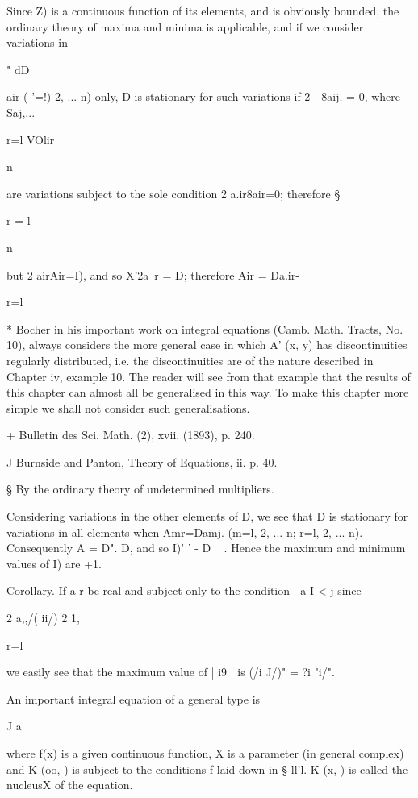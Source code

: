 Since Z) is a continuous function of its elements, and is obviously
bounded, the ordinary theory of maxima and minima is applicable, and
if we consider variations in

" dD

air ( '=!) 2, ... n) only, D is stationary for such variations if 2 -
8aij. = 0, where Saj,...

r=l VOlir

n

are variations subject to the sole condition 2 a.ir8air=0; therefore
§

r = l

n

but 2 airAir=I), and so X'2a\ r = D; therefore Air = Da.ir-

r=l

* Bocher in his important work on integral equations (Camb. Math.
Tracts, No. 10), always considers the more general case in which A'
(x, y) has discontinuities regularly distributed, i.e. the
discontinuities are of the nature described in Chapter iv, example 10.
The reader will see from that example that the results of this chapter
can almost all be generalised in this way. To make this chapter more
simple we shall not consider such generalisations.

+ Bulletin des Sci. Math. (2), xvii. (1893), p. 240.

J Burnside and Panton, Theory of Equations, ii. p. 40.

§ By the ordinary theory of undetermined multipliers.

%
%

Considering variations in the other elements of D, we see that D is
stationary for variations in all elements when Amr=Damj. (m=l, 2, ...
n; r=l, 2, ... n). Consequently A = D". D, and so I)' ' - D ~ . Hence
the maximum and minimum values of I) are +1.

Corollary. If a r be real and subject only to the condition | a I < j
since

2 a,,/( ii/) 2 1,

r=l

we easily see that the maximum value of | i9 | is (/i J/)" = ?i "i/".

An important
integral equation of a general type is

J a

where f(x) is a given continuous function, X is a parameter (in
general complex) and K (oo, ) is subject to the conditions f laid down
in § ll'l. K (x, ) is called the nucleusX of the equation.

